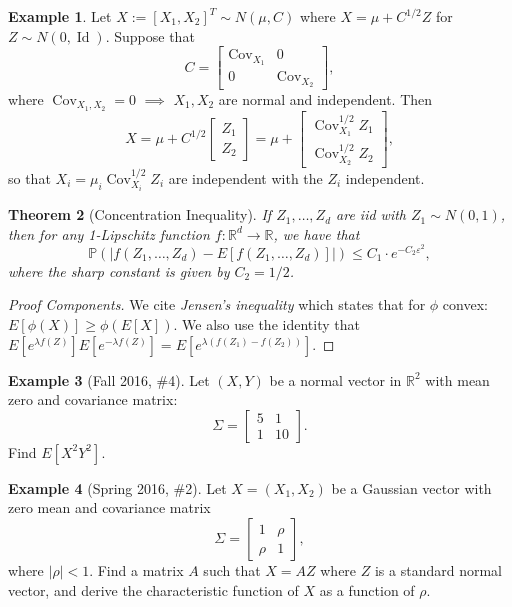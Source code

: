 \documentclass[12pt,reqno]{article}
\renewcommand{\emph}[1]{\textit{#1}}
\theoremstyle{plain}
\newtheorem{theorem}{Theorem}[section]
\theoremstyle{definition}
\newtheorem{example}[theorem]{Example}
\begin{document}
\begin{example}
Let $X := [X_1, X_2]^T \sim N(\mu, C)$ where $X = \mu + C^{1/2} Z$ for 
$Z \sim N(0, \operatorname{Id})$. Suppose that 
\[
C = \begin{bmatrix} \operatorname{Cov}_{X_1} & 0 \\ 
     0 & \operatorname{Cov}_{X_2} \end{bmatrix}, 
\]
where $\operatorname{Cov}_{X_1,X_2} = 0$ $\implies$ $X_1,X_2$ are normal 
and independent. Then 
\[
X = \mu + C^{1/2} \begin{bmatrix} Z_1 \\ Z_2\end{bmatrix} = \mu + 
     \begin{bmatrix} \operatorname{Cov}_{X_1}^{1/2} Z_1 \\ 
     \operatorname{Cov}_{X_2}^{1/2} Z_2 \end{bmatrix}, 
\]
so that $X_i = \mu_i \operatorname{Cov}_{X_i}^{1/2} Z_i$ are independent 
with the $Z_i$ independent. 
\end{example} 

\begin{theorem}[Concentration Inequality]
If $Z_1,\ldots,Z_d$ are iid with $Z_1 \sim N(0, 1)$, then for any 
1-Lipschitz function $f: \mathbb{R}^d \rightarrow \mathbb{R}$, we have that 
\[
\mathbb{P}\left(\left\lvert f(Z_1,\ldots,Z_d) - E[f(Z_1,\ldots,Z_d)] 
     \right\rvert\right) \leq C_1 \cdot e^{-C_2 \varepsilon^2}, 
\]
where the sharp constant is given by $C_2 = 1/2$. 
\end{theorem} 
\begin{proof}[Proof Components]
We cite \emph{Jensen's inequality} which states that for $\phi$ convex: 
$E[\phi(X)] \geq \phi(E[X])$. We also use the identity that 
$E[e^{\lambda f(Z)}] E[e^{-\lambda f(Z)}] = E[e^{\lambda(f(Z_1)-f(Z_2))}]$. 
\end{proof} 

\begin{example}[Fall 2016, \#4]
Let $(X, Y)$ be a normal vector in $\mathbb{R}^2$ with mean zero and 
covariance matrix:
\[
\Sigma = \begin{bmatrix} 5 & 1 \\ 1 & 10 \end{bmatrix}. 
\]
Find $E[X^2Y^2]$. 
\end{example} 

\begin{example}[Spring 2016, \#2]
Let $X = (X_1, X_2)$ be a Gaussian vector with zero mean and 
covariance matrix 
\[
\Sigma = \begin{bmatrix} 1 & \rho \\ \rho & 1 \end{bmatrix}, 
\]
where $|\rho| < 1$. Find a matrix $A$ such that $X = AZ$ where $Z$ is 
a standard normal vector, and derive the characteristic function of $X$ 
as a function of $\rho$. 
\end{example} 
\end{document}
